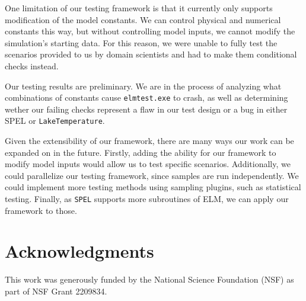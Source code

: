 \documentclass[10pt,twocolumn]{article}
\begin{document}
One limitation of our testing framework is that it currently only supports modification of 
the model constants. We can control physical and numerical constants this way, but without
controlling model inputs, we cannot modify the simulation's starting data. For this 
reason, we were unable to fully test the scenarios provided to us by domain scientists and 
had to make them conditional checks instead.

Our testing results are preliminary. We are in the process of analyzing what
combinations of constants cause \verb|elmtest.exe| to crash, as well as determining wether our
failing checks represent a flaw in our test design or a bug in either SPEL or \verb|LakeTemperature|.

Given the extensibility of our framework, there are many ways our work can be expanded on 
in the future. Firstly, adding the ability for our framework to modify model inputs would
allow us to test specific scenarios. Additionally, we could parallelize our testing 
framework, since samples are run independently. We could implement more testing methods
using sampling plugins, such as statistical testing. Finally, as \verb|SPEL| supports more 
subroutines of ELM, we can apply our framework to those.

\section*{Acknowledgments}


This work was generously funded by the National Science Foundation (NSF) as part of NSF
Grant 2209834. %



\end{document}
